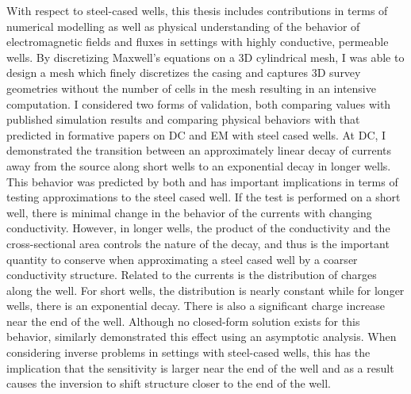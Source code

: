 With respect to steel-cased wells, this thesis includes contributions in terms of numerical modelling as well as physical understanding of the behavior of electromagnetic fields and fluxes in settings with highly conductive, permeable wells. By discretizing Maxwell's equations on a 3D cylindrical mesh, I was able to design a mesh which finely discretizes the casing and captures 3D survey geometries without the number of cells in the mesh resulting in an intensive computation. I considered two forms of validation, both comparing values with published simulation results and comparing physical behaviors with that predicted in formative papers on DC and EM with steel cased wells. At DC, I demonstrated the transition between an approximately linear decay of currents away from the source along short wells to an exponential decay in longer wells. This behavior was predicted by both \cite{Schenkel1991, Kaufman1993} and has important implications in terms of testing approximations to the steel cased well. If the test is performed on a short well, there is minimal change in the behavior of the currents with changing conductivity. However, in longer wells, the product of the conductivity and the cross-sectional area controls the nature of the decay, and thus is the important quantity to conserve when approximating a steel cased well by a coarser conductivity structure. Related to the currents is the distribution of charges along the well. For short wells, the distribution is nearly constant while for longer wells, there is an exponential decay. There is also a significant charge increase near the end of the well. Although no closed-form solution exists for this behavior, \cite{Griffiths1997} similarly demonstrated this effect using an asymptotic analysis. When considering inverse problems in settings with steel-cased wells, this has the implication that the sensitivity is larger near the end of the well and as a result causes the inversion to shift structure closer to the end of the well.

